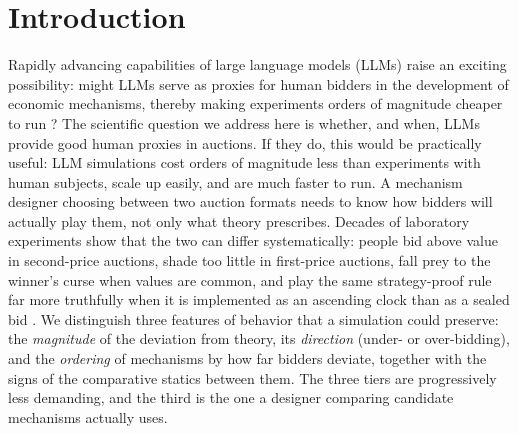 \documentclass[acmsmall,screen,review]{acmart}
\begin{document}


\maketitle

\section{Introduction} \label{sec:introduction}

Rapidly advancing capabilities of large language models (LLMs) raise an exciting possibility: might LLMs serve as proxies for human bidders in the development of economic mechanisms, thereby making experiments orders of magnitude cheaper to run \citep{aher2023using, horton2023large, manning2024automated}?
The scientific question we address here is whether, and when, LLMs provide good human proxies in auctions.
If they do, this would be practically useful: LLM simulations cost orders of magnitude less than experiments with human subjects, scale up easily, and are much faster to run.
A mechanism designer choosing between two auction formats needs to know how bidders will actually play them, not only what theory prescribes.
Decades of laboratory experiments show that the two can differ systematically: people bid above value in second-price auctions, shade too little in first-price auctions, fall prey to the winner's curse when values are common, and play the same strategy-proof rule far more truthfully when it is implemented as an ascending clock than as a sealed bid \citep{kagel1993independent, kagel1986winner, li2017obviously, breitmoser2022obviousness}.
We distinguish three features of behavior that a simulation could preserve: the \emph{magnitude} of the deviation from theory, its \emph{direction} (under- or over-bidding), and the \emph{ordering} of mechanisms by how far bidders deviate, together with the signs of the comparative statics between them.
The three tiers are progressively less demanding, and the third is the one a designer comparing candidate mechanisms actually uses.
\end{document}
